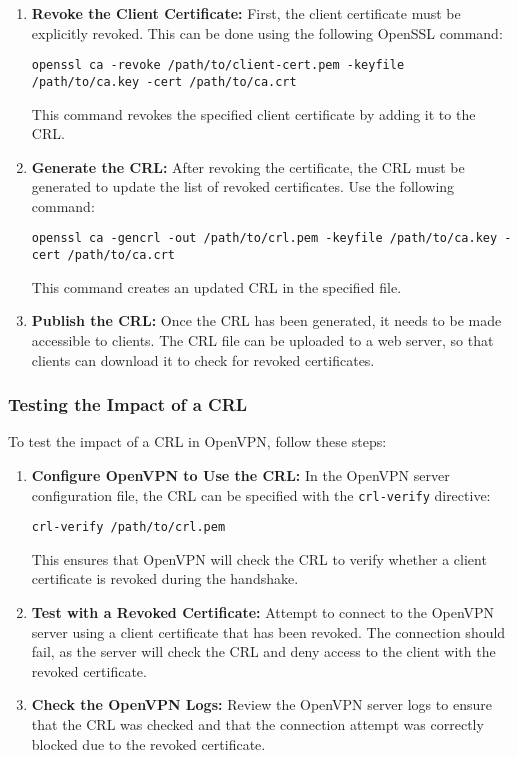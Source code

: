 \begin{enumerate}
    \item \textbf{Revoke the Client Certificate:} 
    First, the client certificate must be explicitly revoked. This can be done using the following OpenSSL command:
    \begin{verbatim}
openssl ca -revoke /path/to/client-cert.pem -keyfile /path/to/ca.key -cert /path/to/ca.crt
    \end{verbatim}
    This command revokes the specified client certificate by adding it to the CRL.

    \item \textbf{Generate the CRL:} 
    After revoking the certificate, the CRL must be generated to update the list of revoked certificates. Use the following command:
    \begin{verbatim}
openssl ca -gencrl -out /path/to/crl.pem -keyfile /path/to/ca.key -cert /path/to/ca.crt
    \end{verbatim}
    This command creates an updated CRL in the specified file.

    \item \textbf{Publish the CRL:} 
    Once the CRL has been generated, it needs to be made accessible to clients. The CRL file can be uploaded to a web server, so that clients can download it to check for revoked certificates.
\end{enumerate}

\subsubsection{Testing the Impact of a CRL}

To test the impact of a CRL in OpenVPN, follow these steps:

\begin{enumerate}
    \item \textbf{Configure OpenVPN to Use the CRL:} 
    In the OpenVPN server configuration file, the CRL can be specified with the \texttt{crl-verify} directive:
    \begin{verbatim}
crl-verify /path/to/crl.pem
    \end{verbatim}
    This ensures that OpenVPN will check the CRL to verify whether a client certificate is revoked during the handshake.

    \item \textbf{Test with a Revoked Certificate:} 
    Attempt to connect to the OpenVPN server using a client certificate that has been revoked. The connection should fail, as the server will check the CRL and deny access to the client with the revoked certificate.

    \item \textbf{Check the OpenVPN Logs:} 
    Review the OpenVPN server logs to ensure that the CRL was checked and that the connection attempt was correctly blocked due to the revoked certificate.
\end{enumerate}


